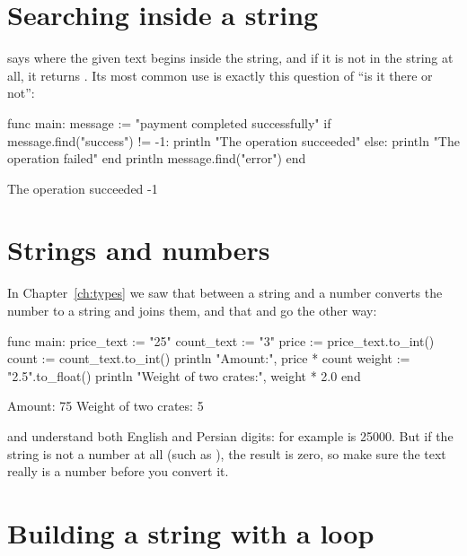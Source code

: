 \section{Searching inside a string}

 says where the given text begins inside the string, and
if it is not in the string at all, it returns . Its most common
use is exactly this question of ``is it there or not'':

\begin{salamcode}
func main:
    message := "payment completed successfully"
    if message.find("success") != -1:
        println "The operation succeeded"
    else:
        println "The operation failed"
    end
    println message.find("error")
end
\end{salamcode}

\begin{salamout}
The operation succeeded
-1
\end{salamout}

\section{Strings and numbers}

In Chapter~\ref{ch:types} we saw that \code{+} between a string and a number
converts the number to a string and joins them, and that 
and  go the other way:

\begin{salamcode}
func main:
    price_text := "25"
    count_text := "3"
    price := price_text.to_int()
    count := count_text.to_int()
    println "Amount:", price * count
    weight := "2.5".to_float()
    println "Weight of two crates:", weight * 2.0
end
\end{salamcode}

\begin{salamout}
Amount: 75
Weight of two crates: 5
\end{salamout}

\begin{warn}
 and  understand both English and Persian
digits: for example  is 25000. But if the
string is not a number at all (such as ), the result is zero, so
make sure the text really is a number before you convert it.
\end{warn}

\section{Building a string with a loop}

